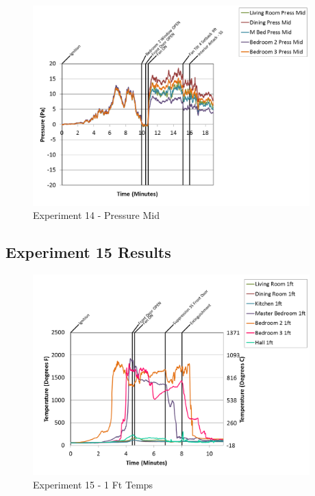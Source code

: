 \documentclass{article}
\begin{document}
\begin{appendices}
\begin{figure}[h!]
	\centering
	\includegraphics[height=3.05in]{0_Images/Results_Charts/Exp_14_Charts/PressureMid.png}
	\caption{Experiment 14 - Pressure Mid}
\end{figure}

\clearpage

\clearpage
\clearpage		\large
\subsection{Experiment 15 Results} \label{App:Exp15Results} 

\begin{figure}[h!]
	\centering
	\includegraphics[height=3.05in]{0_Images/Results_Charts/Exp_15_Charts/1FtTemps.png}
	\caption{Experiment 15 - 1 Ft Temps}
\end{figure}



\end{appendices}
\end{document}
